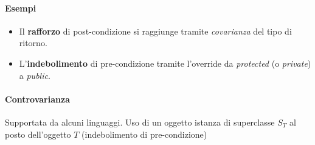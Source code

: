 \paragraph{Esempi} 
\begin{itemize}
    \item Il \textbf{rafforzo} di post-condizione si raggiunge tramite \textit{covarianza} del tipo di ritorno.
    \item L'\textbf{indebolimento} di pre-condizione tramite l'override da \textit{protected} (o \textit{private}) a \textit{public}.
\end{itemize}

\paragraph{Controvarianza} Supportata da alcuni linguaggi. Uso di un oggetto istanza di superclasse $S_T$ al posto dell'oggetto $T$ (indebolimento di pre-condizione)
